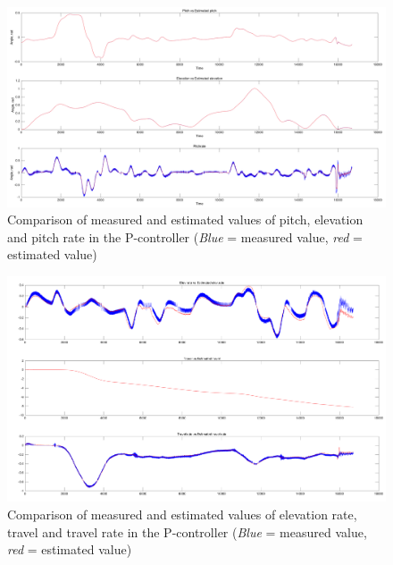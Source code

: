 \begin{figure}[H]
    \centering
    \includegraphics[width=1.0\textwidth]{pitchNpitchrate_P.png}
    \caption{Comparison of measured and estimated values of pitch, elevation and pitch rate in the P-controller (\emph{\color{blue}Blue} = measured value, \emph{\color{red} red} = estimated value)}
    \label{fig:plot1}
\end{figure}

\begin{figure}[H]
    \centering
    \includegraphics[width=1.0\textwidth]{elevrateP.png}
    \caption{Comparison of measured and estimated values of elevation rate, travel and travel rate in the P-controller (\emph{\color{blue}Blue} = measured value, \emph{\color{red} red} = estimated value)}
    \label{fig:plot2}
\end{figure}

